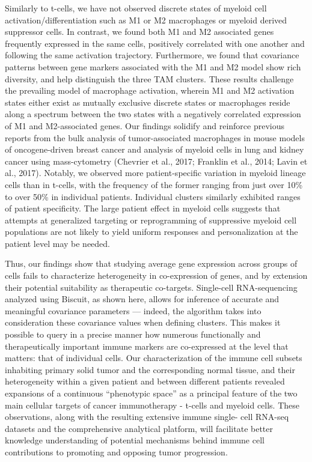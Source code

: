 Similarly to t-cells, we have not observed discrete states of myeloid cell activation/differentiation such as M1 or M2 macrophages or myeloid derived suppressor cells. 
In contrast, we found both M1 and M2 associated genes frequently expressed in the same cells, positively correlated with one another and following the same activation trajectory. 
Furthermore, we found that covariance patterns between gene markers associated with the M1 and M2 model show rich diversity, and help distinguish the three TAM clusters. 
These results challenge the prevailing model of macrophage activation, wherein M1 and M2 activation states either exist as mutually exclusive discrete states or macrophages reside along a spectrum between the two states with a negatively correlated expression of M1 and M2-associated genes. 
Our findings solidify and reinforce previous reports from the bulk analysis of tumor-associated macrophages in mouse models of oncogene-driven breast cancer and analysis of myeloid cells in lung and kidney cancer using mass-cytometry (Chevrier et al., 2017; Franklin et al., 2014; Lavin et al., 2017). %
Notably, we observed more patient-specific variation in myeloid lineage cells than in t-cells, with the frequency of the former ranging from just over 10\% to over 50\% in individual patients.  
Individual clusters similarly exhibited ranges of patient specificity.
The large patient effect in myeloid cells suggests that attempts at generalized targeting or reprogramming of suppressive myeloid cell populations are not likely to yield uniform responses and personalization at the patient level may be needed.

Thus, our findings show that studying average gene expression across groups of cells fails to characterize heterogeneity in co-expression of genes, and by extension their potential suitability as therapeutic co-targets. 
Single-cell RNA-sequencing analyzed using Biscuit, as shown here, allows for inference of accurate and meaningful covariance parameters --- indeed, the algorithm takes into consideration these covariance values when defining clusters. 
This makes it possible to query in a precise manner how numerous functionally and therapeutically important immune markers are co-expressed at the level that matters: that of individual cells. 
Our characterization of the immune cell subsets inhabiting primary solid tumor and the corresponding normal tissue, and their heterogeneity within a given patient and between different patients revealed expansions of a continuous ``phenotypic space'' as a principal feature of the two main cellular targets of cancer immunotherapy - t-cells and myeloid cells. 
These observations, along with the resulting extensive immune single- cell RNA-seq datasets and the comprehensive analytical platform, will facilitate better knowledge understanding of potential mechanisms behind immune cell contributions to promoting and opposing tumor progression. 

